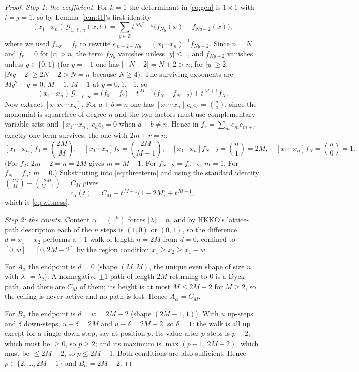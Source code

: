 \documentclass[11pt]{article}
\theoremstyle{definition}
\newcommand{\la}{\lambda}
\newcommand{\Z}{\mathbb{Z}}
\newcommand{\edot}{\dot{e}}
\begin{document}
\begin{proof}
\emph{Step 1: the coefficient.} For $k=1$ the determinant in \eqref{eq:gen} is
$1\times1$ with $i=j=1$, so by Lemma~\ref{lem:t1}'s first identity
\[
 (x_1\cdots x_n)\,\mathcal G_{1,\ell,n}(x;t)
 =\sum_{y\in\Z}t^{\,My^{2}-y}\bigl(f_{Ny}(x)-f_{Ny-2}(x)\bigr),
\]
where we used $f_{-r}=f_{r}$ to rewrite $\edot_{\,n+2-Ny}=(x_1\cdots x_n)^{-1}f_{Ny-2}$.
Since $n=N$ and $f_r=0$ for $|r|>n$, the term $f_{Ny}$ vanishes unless
$|y|\le1$, and $f_{Ny-2}$ vanishes unless $y\in\{0,1\}$ (for $y=-1$ one has
$|{-N-2}|=N+2>n$; for $|y|\ge2$, $|Ny-2|\ge 2N-2>N=n$ because $N\ge4$). The
surviving exponents are $My^2-y=0,\,M-1,\,M+1$ at $y=0,1,-1$, so
\begin{equation}\label{eq:threeterm}
 (x_1\cdots x_n)\,\mathcal G_{1,\ell,n}
 =\bigl(f_0-f_2\bigr)+t^{\,M-1}\bigl(f_{N}-f_{N-2}\bigr)+t^{\,M+1}f_{N}.
\end{equation}
Now extract $[x_1x_2\cdots x_n]$. For $a+b=n$ one has
$[x_1\cdots x_n]\,e_a e_b=\binom{n}{a}$, since the monomial is squarefree of
degree $n$ and the two factors must use complementary variable sets; and
$[x_1\cdots x_n]\,e_ae_b=0$ when $a+b\ne n$. Hence in
$f_r=\sum_m e_me_{m+r}$ exactly one term survives, the one with $2m+r=n$:
\[
 [x_1\cdots x_n]f_0=\binom{2M}{M},\quad
 [x_1\cdots x_n]f_2=\binom{2M}{M-1},\quad
 [x_1\cdots x_n]f_{N-2}=\binom{n}{1}=2M,\quad
 [x_1\cdots x_n]f_{N}=\binom{n}{0}=1 .
\]
(For $f_2$: $2m+2=n=2M$ gives $m=M-1$. For $f_{N-2}=f_{n-2}$: $m=1$. For
$f_N=f_n$: $m=0$.) Substituting into \eqref{eq:threeterm} and using the
standard identity $\binom{2M}{M}-\binom{2M}{M-1}=C_M$ gives
\[
 c_\alpha(t)=C_M+t^{\,M-1}\bigl(1-2M\bigr)+t^{\,M+1},
\]
which is \eqref{eq:witness}.

\emph{Step 2: the counts.} Content $\alpha=(1^n)$ forces $|\la|=n$, and by
HKKO's lattice-path description each of the $n$ steps is $(1,0)$ or $(0,1)$,
so the difference $d=x_1-x_2$ performs a $\pm1$ walk of length $n=2M$ from
$d=0$, confined to $[0,w]=[0,2M-2]$ by the region condition
$x_1\ge x_2\ge x_1-w$.

For $A_\alpha$ the endpoint is $d=0$ (shape $(M,M)$, the unique even shape of
size $n$ with $\la_1=\la_2$). A nonnegative $\pm1$ path of length $2M$
returning to $0$ is a Dyck path, and there are $C_M$ of them; its height is at
most $M\le 2M-2$ for $M\ge2$, so the ceiling is never active and no path is
lost. Hence $A_\alpha=C_M$.

For $B_\alpha$ the endpoint is $d=w=2M-2$ (shape $(2M-1,1)$). With $u$ up-steps
and $\delta$ down-steps, $u+\delta=2M$ and $u-\delta=2M-2$, so $\delta=1$: the
walk is all up except for a single down-step, say at position $p$. Its value
after $p$ steps is $p-2$, which must be $\ge0$, so $p\ge2$; and its maximum is
$\max(p-1,\,2M-2)$, which must be $\le 2M-2$, so $p\le 2M-1$. Both conditions
are also sufficient. Hence $p\in\{2,\dots,2M-1\}$ and $B_\alpha=2M-2$.


\end{proof}
\end{document}
